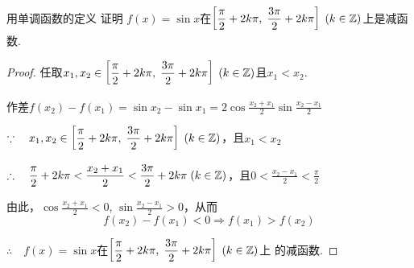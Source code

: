 \begin{example}
用单调函数的定义 证明 $f(x)=\sin x$在$\left[\dfrac{\pi}{2}+2k\pi,\; \dfrac{3\pi}{2}+2k\pi\right]\; (k\in\mathbb{Z})$上是减函数.
\end{example}

\begin{proof}
任取$x_1,x_2\in \left[\dfrac{\pi}{2}+2k\pi,\; \dfrac{3\pi}{2}+2k\pi\right]\; (k\in\mathbb{Z})$且$x_1<x_2$.

作差$f(x_2)-f(x_1)=\sin x_2-\sin x_1=2\cos\frac{x_2+x_1}{2}\sin\frac{x_2-x_1}{2}$

$\because\quad x_1,x_2\in \left[\dfrac{\pi}{2}+2k\pi,\; \dfrac{3\pi}{2}+2k\pi\right]\; (k\in\mathbb{Z})$，且$x_1<x_2$

$\therefore\quad \dfrac{\pi}{2}+2k\pi<\dfrac{x_2+x_1}{2}<\dfrac{3\pi}{2}+2k\pi\; (k\in\mathbb{Z})$，且$0<\frac{x_2-x_1}{2}<\frac{\pi}{2}$

由此，$\cos\frac{x_2+x_1}{2}<0$, $\sin\frac{x_2-x_1}{2}>0$，从而
\[f(x_2)-f(x_1)<0\Longrightarrow f(x_1)>f(x_2)\]

$\therefore\quad f(x)=\sin x$在$\left[\dfrac{\pi}{2}+2k\pi,\; \dfrac{3\pi}{2}+2k\pi\right]\; (k\in\mathbb{Z})$上
的减函数.
\end{proof}

